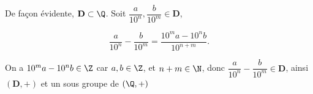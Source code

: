  
De façon évidente, $\mathbf D \subset \Q$. Soit $\dfrac{a}{10^n}, \dfrac{b}{10^m} \in \mathbf{D}$,

\[\dfrac{a}{10^n} - \dfrac{b}{10^m} = \dfrac{10^ma - 10^nb}{10^{n+m}}. \]


On a $10^ma - 10^nb \in \Z$ car $a,b \in \Z$, et $n+m \in \N$, donc $\dfrac{a}{10^n} - \dfrac{b}{10^m} \in \mathbf{D}$, ainsi 
$(\mathbf{D}, +)$ et un sous groupe de $( \Q, +)$